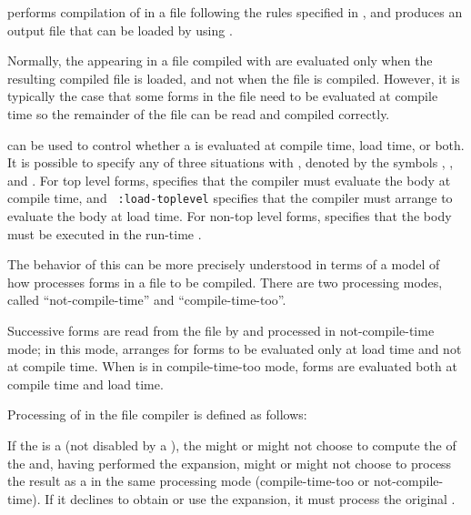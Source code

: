  performs compilation of 
 in a file following the rules specified in \secref\CompilationSemantics,
and produces an output file that can be loaded by using .
 
Normally, the  appearing in a file compiled with
 are evaluated only when the resulting
compiled file is loaded, and not when the file is compiled.  However,
it is typically the case that some forms in the file need to be evaluated
at compile time so the
remainder of the file can be read and compiled correctly.

 can be used to control
whether a  is evaluated at compile time, load
time, or both.  It is possible to specify any of three situations with
, denoted by the symbols ,
, and .  For top level 
 forms,  specifies that the
compiler must evaluate the body at compile time, and {\tt
:load-toplevel} specifies that the compiler must arrange to evaluate
the body at load time. For non-top level  forms,
 specifies that the body must be executed in the run-time
.

The behavior of this  can be more precisely understood in
terms of a model of how  processes forms in
a file to be compiled. There are two processing modes, called
``not-compile-time'' and ``compile-time-too''.
 
Successive forms are read from the file by 
and processed in not-compile-time mode; in this mode, 
 arranges for forms to be evaluated only at load time
and not at compile time.  When  is in
compile-time-too mode, forms are evaluated both at compile time and
load time.


Processing of  in the file compiler is defined
as follows:

\beginlist
{}
  If the  is a 
(not disabled by a  ),
the  might or might not choose to compute
the  of the  and,
having performed the expansion, might or might not choose to process the result
as a  in the same processing mode
(compile-time-too or not-compile-time).
If it declines to obtain or use the expansion, it must process the original .
 
